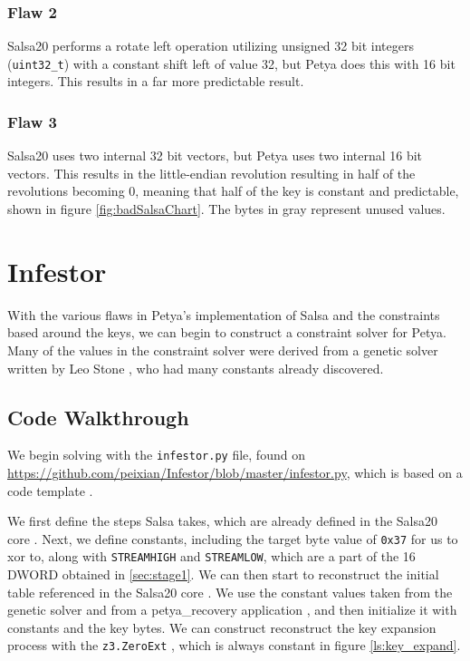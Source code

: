 \documentclass[twocolumn]{article}
\newcommand{\code}[1]{\texttt{#1}}
\begin{document}
\subsubsection{Flaw 2}
Salsa20 performs a rotate left operation utilizing unsigned 32 bit integers (\code{uint32\_t}) \cite{salsa20} with a constant shift left of value 32, but Petya does this with 16 bit integers. This results in a far more predictable result.

\subsubsection{Flaw 3}
Salsa20 uses two internal 32 bit vectors, but Petya uses two internal 16 bit vectors. This results in the little-endian revolution resulting in half of the revolutions becoming 0, meaning that half of the key is constant and predictable, shown in figure \ref{fig:badSalsaChart}. The bytes in gray represent unused values. 


\section{Infestor}
\label{sec:infestor}
With the various flaws in Petya's implementation of Salsa and the constraints based around the keys, we can begin to construct a constraint solver for Petya. Many of the values in the constraint solver were derived from a genetic solver written by Leo Stone \cite{geneticSolver}, who had many constants already discovered.

\subsection{Code Walkthrough}

We begin solving with the \code{infestor.py} file, found on \url{https://github.com/peixian/Infestor/blob/master/infestor.py}, which is based on a code template \cite{codeTemplate}.

We first define the steps Salsa takes, which are already defined in the Salsa20 core \cite{salsa20Core}. Next, we define constants, including the target byte value of \code{0x37} for us to xor to, along with \code{STREAMHIGH} and \code{STREAMLOW}, which are a part of the 16 DWORD obtained in \ref{sec:stage1}. We can then start to reconstruct the initial table referenced in the Salsa20 core \cite{salsa20Core}. We use the constant values taken from the genetic solver \cite{geneticSolver} and from a petya\_recovery application \cite{petyaRecovery}, and then initialize it with constants and the key bytes. We can construct reconstruct the key expansion process with the \code{z3.ZeroExt} \cite{z3Guide}, which is always constant in figure \ref{ls:key_expand}. 
\end{document}
